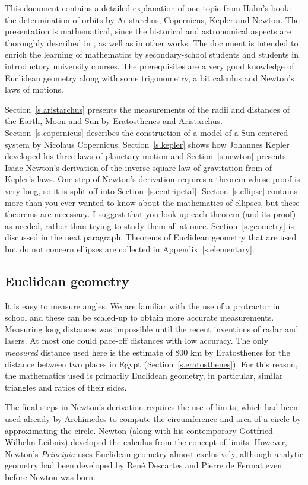 This document contains a detailed explanation of one topic from Hahn's book: the determination of orbits by Aristarchus, Copernicus, Kepler and Newton. The presentation is mathematical, since the historical and astronomical aspects are thoroughly described in \cite{hahn-cic}, as well as in other works. The document is intended to enrich the learning of mathematics by secondary-school students and students in introductory university courses. The prerequisites are a very good knowledge of Euclidean geometry along with some trigonometry, a bit calculus and Newton's laws of motions.

Section~\ref{s.aristarchus} presents the measurements of the radii and distances of the Earth, Moon and Sun by Eratosthenes and Aristarchus. Section~\ref{s.copernicus} describes the construction of a model of a Sun-centered system by Nicolaus Copernicus. Section~\ref{s.kepler} shows how Johannes Kepler developed his three laws of planetary motion and Section~\ref{s.newton} presents Isaac Newton's derivation of the inverse-square law of gravitation from of Kepler's laws. One step of Newton's derivation requires a theorem whose proof is very long, so it is split off into Section~\ref{s.centripetal}. Section~\ref{s.ellipse} contains more than you ever wanted to know about the mathematics of ellipses, but these theorems are necessary. I suggest that you look up each theorem (and its proof) as needed, rather than trying to study them all at once. Section~\ref{s.geometry} is discussed in the next paragraph. Theorems of Euclidean geometry that are used but do not concern ellipses are collected in Appendix~\ref{s.elementary}.

\subsection*{Euclidean geometry}

It is easy to measure angles. We are familiar with the use of a protractor in school and these can be scaled-up to obtain more accurate measurements. Measuring long distances was impossible until the recent inventions of radar and lasers. At most one could pace-off distances with low accuracy. The only \emph{measured} distance used here is the estimate of $800$ km by Eratosthenes for the distance between two places in Egypt (Section~\ref{s.eratosthenes}). For this reason, the mathematics used is primarily Euclidean geometry, in particular, similar triangles and ratios of their sides.

The final steps in Newton's derivation requires the use of limits, which had been used already by Archimedes to compute the circumference and area of a circle by approximating the circle. Newton (along with his contemporary Gottfried Wilhelm Leibniz) developed the calculus from the concept of limits. However, Newton's \textit{Principia} uses Euclidean geometry almost exclusively, although analytic geometry had been developed by René Descartes and Pierre de Fermat even before Newton was born.

